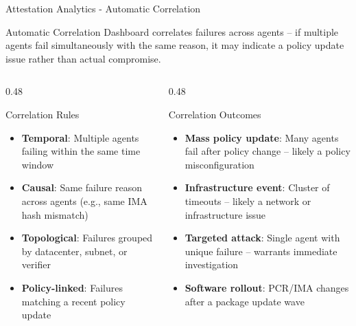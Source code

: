 \begin{frame}{Attestation Analytics - Automatic Correlation}
  \begin{exampleblock}{Automatic Correlation}
    \scriptsize
    Dashboard correlates failures across agents -- if multiple agents fail simultaneously
    with the same reason, it may indicate a policy update issue rather than actual compromise.
  \end{exampleblock}

  \vspace{0.3cm}

  \begin{columns}[T]
    \begin{column}{0.48\textwidth}
      \begin{block}{Correlation Rules}
        \scriptsize
        \begin{itemize}
          \item \textbf{Temporal}: Multiple agents failing within the same time window
          \item \textbf{Causal}: Same failure reason across agents (e.g., same IMA hash mismatch)
          \item \textbf{Topological}: Failures grouped by datacenter, subnet, or verifier
          \item \textbf{Policy-linked}: Failures matching a recent policy update
        \end{itemize}
      \end{block}
    \end{column}
    \begin{column}{0.48\textwidth}
      \begin{block}{Correlation Outcomes}
        \scriptsize
        \begin{itemize}
          \item \textbf{Mass policy update}: Many agents fail after policy change -- likely a policy misconfiguration
          \item \textbf{Infrastructure event}: Cluster of timeouts -- likely a network or infrastructure issue
          \item \textbf{Targeted attack}: Single agent with unique failure -- warrants immediate investigation
          \item \textbf{Software rollout}: PCR/IMA changes after a package update wave
        \end{itemize}
      \end{block}
    \end{column}
  \end{columns}

\end{frame}

